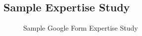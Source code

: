 \subsection{Sample Expertise Study}

\begin{figure}
    \centerline{
      \hfil
       }
    \caption{Sample Google Form Expertise Study} \label{fig:sampleSurvey}
\end{figure}











